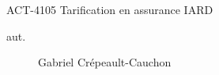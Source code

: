 \begin{contrib}{ACT-4105\: Tarification en assurance IARD}
\begin{description}
	\item[aut.] Gabriel Crépeault-Cauchon 
\end{description}
\end{contrib}